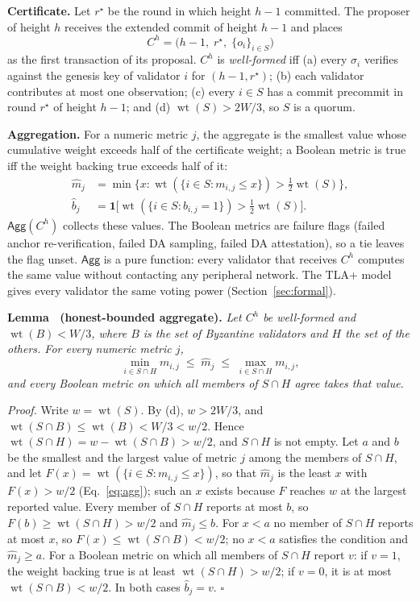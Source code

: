 \textbf{Certificate.} Let $r^{\star}$ be the round in which height $h{-}1$
committed. The proposer of height $h$ receives the extended commit of height
$h{-}1$ and places
\[
C^{h} = \bigl(h{-}1,\; r^{\star},\; \{o_i\}_{i \in S}\bigr)
\]
as the first transaction of its proposal. $C^{h}$ is \emph{well-formed} iff
(a) every $\sigma_i$ verifies against the genesis key of validator $i$ for
$(h{-}1, r^{\star})$; (b) each validator contributes at most one observation;
(c) every $i \in S$ has a commit precommit in round $r^{\star}$ of height
$h{-}1$; and (d) $\operatorname{wt}(S) > 2W/3$, so $S$ is a quorum.

\textbf{Aggregation.} For a numeric metric $j$, the aggregate is the smallest
value whose cumulative weight exceeds half of the certificate weight; a
Boolean metric is true iff the weight backing true exceeds half of it:
\begin{align}
\widehat m_j &= \min\bigl\{x : \operatorname{wt}(\{i \in S : m_{i,j} \le x\}) > \tfrac12 \operatorname{wt}(S)\bigr\}, \label{eq:agg}\\
\widehat b_j &= \mathbf{1}\bigl[\operatorname{wt}(\{i \in S : b_{i,j} = 1\}) > \tfrac12 \operatorname{wt}(S)\bigr]. \nonumber
\end{align}
$\mathsf{Agg}(C^{h})$ collects these values. The Boolean metrics are failure
flags (failed anchor re-verification, failed DA sampling, failed DA
attestation), so a tie leaves the flag unset. $\mathsf{Agg}$ is a pure
function: every validator that receives $C^{h}$ computes the same value
without contacting any peripheral network. The TLA+ model gives every
validator the same voting power (Section~\ref{sec:formal}).

\label{lem:honest-range}\textbf{Lemma~\thelemma{} (honest-bounded aggregate).} \emph{Let $C^{h}$ be well-formed
and $\operatorname{wt}(B) < W/3$, where $B$ is the set of Byzantine validators and
$H$ the set of the others. For every numeric metric $j$,}
\[
\min_{i \in S \cap H} m_{i,j} \;\le\; \widehat m_j \;\le\; \max_{i \in S \cap H} m_{i,j},
\]
\emph{and every Boolean metric on which all members of $S \cap H$ agree takes
that value.}

\emph{Proof.} Write $w = \operatorname{wt}(S)$. By (d), $w > 2W/3$, and
$\operatorname{wt}(S \cap B) \le \operatorname{wt}(B) < W/3 < w/2$. Hence
$\operatorname{wt}(S \cap H) = w - \operatorname{wt}(S \cap B) > w/2$, and
$S \cap H$ is not empty. Let $a$ and $b$ be the smallest and the largest value of
metric $j$ among the members of $S \cap H$, and let
$F(x) = \operatorname{wt}(\{i \in S : m_{i,j} \le x\})$, so that $\widehat m_j$
is the least $x$ with $F(x) > w/2$ (Eq.~\eqref{eq:agg}); such an $x$ exists
because $F$ reaches $w$ at the largest reported value. Every member of
$S \cap H$ reports at most $b$, so $F(b) \ge \operatorname{wt}(S \cap H) > w/2$
and $\widehat m_j \le b$. For $x < a$ no member of $S \cap H$ reports at most
$x$, so $F(x) \le \operatorname{wt}(S \cap B) < w/2$; no $x < a$ satisfies the
condition and $\widehat m_j \ge a$. For a Boolean metric on which all members of
$S \cap H$ report $v$: if $v = 1$, the weight backing true is at least
$\operatorname{wt}(S \cap H) > w/2$; if $v = 0$, it is at most
$\operatorname{wt}(S \cap B) < w/2$. In both cases $\widehat b_j = v$. $\square$

